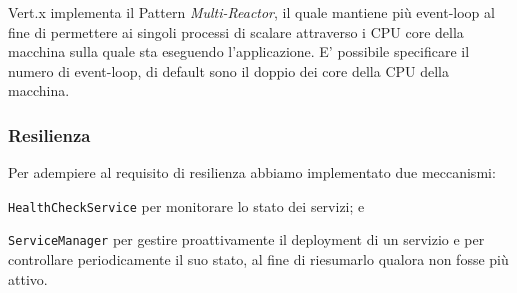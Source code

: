 \documentclass[a4paper]{article}
\begin{document}
Vert.x implementa il Pattern \textit{Multi-Reactor}, il quale mantiene più event-loop al fine di permettere ai singoli processi di scalare attraverso i CPU core della macchina sulla quale sta eseguendo l'applicazione.
E' possibile specificare il numero di event-loop, di default sono il doppio dei core della CPU della macchina. 

\subsubsection{Resilienza}
Per adempiere al requisito di resilienza abbiamo implementato due meccanismi: \newline
\begin{enumerate*}[label=(\arabic*)]
    \item \texttt{HealthCheckService} per monitorare lo stato dei servizi; e
    \item \texttt{ServiceManager} per gestire proattivamente il deployment di un servizio e per controllare periodicamente il suo stato, al fine di riesumarlo qualora non fosse più attivo.
\end{enumerate*}
\end{document}
